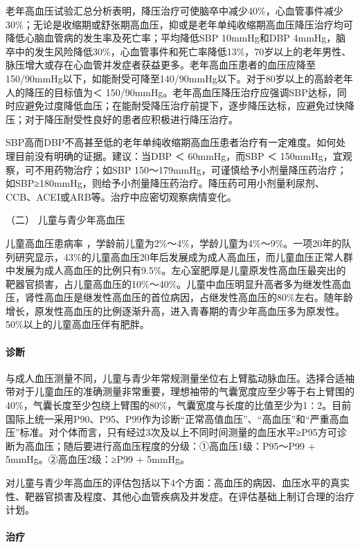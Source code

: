 老年高血压试验汇总分析表明，降压治疗可使脑卒中减少40\%，心血管事件减少30\%；无论是收缩期或舒张期高血压，抑或是老年单纯收缩期高血压降压治疗均可降低心脑血管病的发生率及死亡率；平均降低SBP
10mmHg和DBP
4mmHg，脑卒中的发生风险降低30\%，心血管事件和死亡率降低13\%，70岁以上的老年男性、脉压增大或存在心血管并发症者获益更多。老年高血压患者的血压应降至150/90mmHg以下，如能耐受可降至140/90mmHg以下。对于80岁以上的高龄老年人的降压的目标值为＜
150/90mmHg。老年高血压降压治疗应强调SBP达标，同时应避免过度降低血压；在能耐受降压治疗前提下，逐步降压达标，应避免过快降压；对于降压耐受性良好的患者应积极进行降压治疗。

SBP高而DBP不高甚至低的老年单纯收缩期高血压患者治疗有一定难度。如何处理目前没有明确的证据。建议：当DBP
＜ 60mmHg，而SBP ＜ 150mmHg，宜观察，可不用药物治疗；如SBP
150～179mmHg，可谨慎给予小剂量降压药治疗；如SBP≥180mmHg，则给予小剂量降压药治疗。降压药可用小剂量利尿剂、CCB、ACEI或ARB等。治疗中应密切观察病情变化。

\hypertarget{text00409.htmlux5cux23CHP17-3-1-8-2}{}
（二） 儿童与青少年高血压

儿童高血压患病率
，学龄前儿童为2\%～4\%，学龄儿童为4\%～9\%。一项20年的队列研究显示，43\%的儿童高血压20年后发展成为成人高血压，而儿童血压正常人群中发展为成人高血压的比例只有9.5\%。左心室肥厚是儿童原发性高血压最突出的靶器官损害，占儿童高血压的10\%～40\%。儿童中血压明显升高者多为继发性高血压，肾性高血压是继发性高血压的首位病因，占继发性高血压的80\%左右。随年龄增长，原发性高血压的比例逐渐升高，进入青春期的青少年高血压多为原发性。50\%以上的儿童高血压伴有肥胖。

\paragraph{诊断}

与成人血压测量不同，儿童与青少年常规测量坐位右上臂肱动脉血压。选择合适袖带对于儿童血压的准确测量非常重要，理想袖带的气囊宽度应至少等于右上臂围的40\%，气囊长度至少包绕上臂围的80\%，气囊宽度与长度的比值至少为1∶2。目前国际上统一采用P90、P95、P99作为诊断“正常高值血压”、“高血压”和“严重高血压”标准。对个体而言，只有经过3次及以上不同时间测量的血压水平≥P95方可诊断为高血压；随后要进行高血压程度的分级：①高血压1级：P95～P99
+ 5mmHg。②高血压2级：≥P99 + 5mmHg。

对儿童与青少年高血压的评估包括以下4个方面：高血压的病因、血压水平的真实性、靶器官损害及程度、其他心血管疾病及并发症。在评估基础上制订合理的治疗计划。

\paragraph{治疗}

